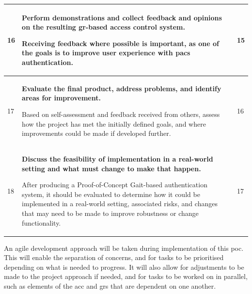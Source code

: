 \begin{scriptsize}
\begin{longtable}[c]{|p{}|p{}|p{}|}
        16          & \textbf{Perform demonstrations and collect feedback and opinions on the resulting \ac{gr}-based access control system.}                                                           \par Receiving feedback where possible is important, as one of the goals is to improve user experience with \ac{pacs} authentication.                                                                                                  & 15                    \\ \hline
        17          & \textbf{Evaluate the final product, address problems, and identify areas for improvement.}                                                 \par Based on self-assessment and feedback received from others, assess how the project has met the initially defined goals, and where improvements could be made if developed further.                                                                                       & 16                    \\ \hline
        18          & \textbf{Discuss the feasibility of implementation in a real-world setting and what must change to make that happen.}                          \par After producing a Proof-of-Concept Gait-based authentication system, it should be evaluated to determine how it could be implemented in a real-world setting, associated risks, and changes that may need to be made to improve robustness or change functionality.   & 17                    \\
    \end{longtable}
\end{scriptsize}

An agile development approach will be taken during implementation of this \ac{poc}.
This will enable the separation of concerns, and for tasks to be prioritised depending on what is needed to progress.
It will also allow for adjustments to be made to the project approach if needed, and for tasks to be worked on in parallel, such as elements of the \ac{acc} and \ac{grs} that are dependent on one another.
